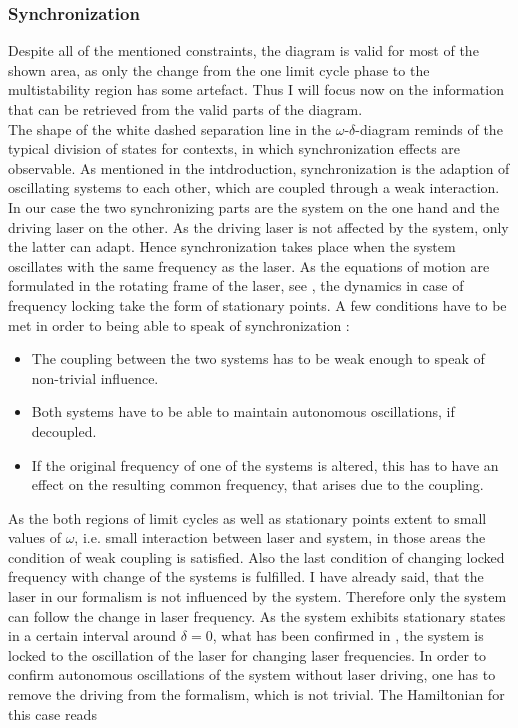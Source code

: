 \subsubsection{Synchronization}\label{sec:synchronization}
Despite all of the mentioned constraints, the diagram is valid for most of the shown area, as only the change from the one limit cycle phase to the multistability region has some artefact. Thus I will focus now on the information that can be retrieved from the valid parts of the diagram.\\%
The shape of the white dashed separation line in the $\omega$-$\delta$-diagram reminds of the typical division of states for contexts, in which synchronization effects are observable. As mentioned in the intdroduction, synchronization is the adaption of oscillating systems to each other, which are coupled through a weak interaction. In our case the two synchronizing parts are the system on the one hand and the driving laser on the other. As the driving laser is not affected by the system, only the latter can adapt. Hence synchronization takes place when the system oscillates with the same frequency as the laser. As the equations of motion are formulated in the rotating frame of the laser, see , the dynamics in case of frequency locking take the form of stationary points. A few conditions have to be met in order to being able to speak of synchronization \cite{pikovskij_synchronization_2007}:
\begin{itemize}
    \item The coupling between the two systems has to be weak enough to speak of non-trivial influence.
    \item Both systems have to be able to maintain autonomous oscillations, if decoupled.
    \item If the original frequency of one of the systems is altered, this has to have an effect on the resulting common frequency, that arises due to the coupling.
\end{itemize}
As the both regions of limit cycles as well as stationary points extent to small values of $\omega$, i.e. small interaction between laser and system, in those areas the condition of weak coupling is satisfied. Also the last condition of changing locked frequency with change of the systems is fulfilled. I have already said, that the laser in our formalism is not influenced by the system. Therefore only the system can follow the change in laser frequency. As the system exhibits stationary states in a certain interval around $\delta=0$, what has been confirmed in , the system is locked to the oscillation of the laser for changing laser frequencies. In order to confirm autonomous oscillations of the system without laser driving, one has to remove the driving from the formalism, which is not trivial. The Hamiltonian for this case reads
